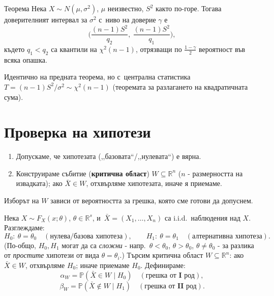 \begin{thmbox}{Теорема}
Нека $X\sim N(\mu,\sigma^2)$, $\mu$ неизвестно, $S^2$ както по-горе.
Тогава доверителният интервал за $\sigma^2$ с~ниво на доверие
$\gamma$ е
\[
  \Big(\frac{(n-1)S^2}{q_2},\ \frac{(n-1)S^2}{q_1}\Big),
\]
където $q_1<q_2$ са квантили на $\chi^2(n-1)$, отрязващи по
$\tfrac{1-\gamma}2$ вероятност във всяка опашка.
\end{thmbox}

\begin{proofbox}
Идентично на предната теорема, но с~централна статистика $T=(n-1)
S^2/\sigma^2\sim\chi^2(n-1)$ (теоремата за разлагането на
квадратичната сума). \qedbg
\end{proofbox}

\section{Проверка на хипотези}

\begin{rembox}
\begin{enumerate}[label=\arabic*)]
  \item Допускаме, че хипотезата (,,базовата``/,,нулевата``) е вярна.
  \item Конструираме събитие (\textbf{критична област}) $W\subseteq\mathbb R^n$ ($n$ - размерността на извадката); ако $\bar X\in W$, отхвърляме хипотезата, иначе я приемаме.
\end{enumerate}
Изборът на $W$ зависи от вероятността за грешка, която сме готови да
допуснем.
\end{rembox}

\begin{defbox}
Нека $X\sim F_X(x;\theta)$, $\theta\in\mathbb R^s$, и~$\bar X=(X_1,
\dots,X_n)$ са i.i.d.\ наблюдения над $X$. Разглеждаме:
\[
  H_0:\ \theta=\theta_0 \quad(\text{нулева/базова хипотеза}),
  \qquad
  H_1:\ \theta=\theta_1 \quad(\text{алтернативна хипотеза}).
\]
(По-общо, $H_0,H_1$ могат да са \emph{сложни} - напр.\ $\theta<
\theta_0$, $\theta>\theta_0$, $\theta\neq\theta_0$ - за разлика от
\emph{простите} хипотези от вида $\theta=\theta_i$.) Търсим критична
област $W\subseteq\mathbb R^n$: ако $\bar X\in W$, отхвърляме $H_0$;
иначе приемаме $H_0$. Дефинираме:
\[
  \alpha_W = \mathbb P(\bar X\in W \mid H_0) \quad(\textbf{грешка от I род}),
\]
\[
  \beta_W = \mathbb P(\bar X\notin W \mid H_1) \quad(\textbf{грешка от II род}).
\]
\end{defbox}

